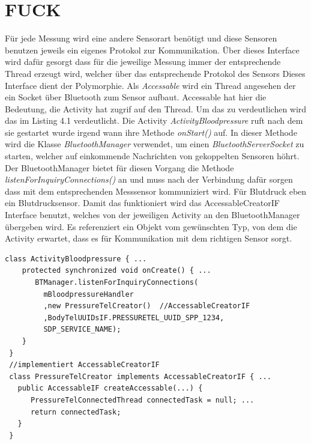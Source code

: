 

\section{FUCK}


 F\"ur jede Messung wird eine andere Sensorart ben\"otigt und diese Sensoren benutzen jeweils ein eigenes Protokol zur Kommunikation.
 \"Uber dieses Interface wird daf\"ur gesorgt dass f\"ur die jeweilige Messung immer der entsprechende Thread erzeugt wird, welcher \"uber das entsprechende
 Protokol des Sensors 
 Dieses Interface dient der Polymorphie.
 Als \emph{Accessable} wird ein Thread angesehen der ein Socket \"uber Bluetooth zum Sensor aufbaut.
 Accessable hat hier die Bedeutung, die Activity hat zugrif auf den Thread.
 Um das zu verdeutlichen wird das im Listing 4.1 verdeutlicht.
 Die Activity \emph{ActivityBloodpressure} ruft nach dem sie gestartet wurde irgend wann ihre Methode \emph{onStart()} auf.
 In dieser Methode wird die Klasse \emph{BluetoothManager} verwendet, um einen \emph{BluetoothServerSocket} zu starten, welcher auf einkommende Nachrichten
 von gekoppelten Sensoren h\"ohrt.
 Der BluetoothManager bietet f\"ur diesen Vorgang die Methode \emph{listenForInquiryConnections()} an und
 muss nach der Verbindung daf\"ur sorgen dass mit dem entsprechenden Messsensor kommuniziert wird.
 F\"ur Blutdruck eben ein Blutdrucksensor.
 Damit das funktioniert wird das AccessableCreatorIF Interface benutzt, welches von der jeweiligen Activity an den BluetoothManager \"ubergeben wird.
 Es referenziert ein Objekt vom gew\"unschten Typ, von dem die Activity erwartet, dass es f\"ur Kommunikation mit dem richtigen Sensor sorgt.\\
 
 \begin{lstlisting}[caption={Beispiel f\"ur ein einfaches HTML-Dokument}]
 class ActivityBloodpressure { ... 
    protected synchronized void onCreate() { ...
       BTManager.listenForInquiryConnections(
         mBloodpressureHandler
         ,new PressureTelCreator()  //AccessableCreatorIF
         ,BodyTelUUIDsIF.PRESSURETEL_UUID_SPP_1234,
         SDP_SERVICE_NAME);
    }
 }
 //implementiert AccessableCreatorIF
 class PressureTelCreator implements AccessableCreatorIF { ...
   public AccessableIF createAccessable(...) {
      PressureTelConnectedThread connectedTask = null; ...
      return connectedTask;
   } 
 }
\end{lstlisting}

